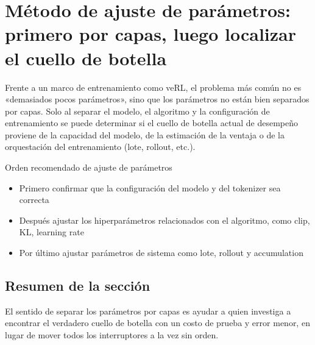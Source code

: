 \section{Método de ajuste de parámetros: primero por capas, luego localizar el cuello de botella}
Frente a un marco de entrenamiento como veRL, el problema más común no es «demasiados pocos parámetros», sino que los parámetros no están bien separados por capas. Solo al separar el modelo, el algoritmo y la configuración de entrenamiento se puede determinar si el cuello de botella actual de desempeño proviene de la capacidad del modelo, de la estimación de la ventaja o de la orquestación del entrenamiento (lote, rollout, etc.).

\begin{knowledgebox}{Orden recomendado de ajuste de parámetros}
\begin{itemize}
  \item Primero confirmar que la configuración del modelo y del tokenizer sea correcta
  \item Después ajustar los hiperparámetros relacionados con el algoritmo, como clip, KL, learning rate
  \item Por último ajustar parámetros de sistema como lote, rollout y accumulation
\end{itemize}
\end{knowledgebox}

\subsection{Resumen de la sección}
El sentido de separar los parámetros por capas es ayudar a quien investiga a encontrar el verdadero cuello de botella con un costo de prueba y error menor, en lugar de mover todos los interruptores a la vez sin orden.

\newpage
